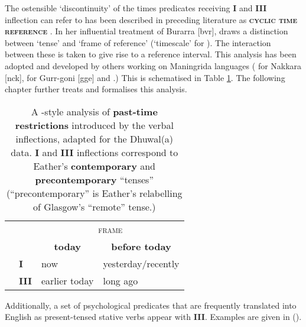  The ostensible `discontinuity' of the times predicates receiving \textbf{I} and \textbf{III} inflection can refer to has been described in preceding literature as \textbf{\textsc{cyclic time reference}} \citep[88]{Comrie1983}. In her influential treatment of Burarra [\gls{bvr}], \citet{Glasgow1964} draws a distinction between `tense' and `frame of reference' (`timescale' for \citealt[48]{Green1987}). The interaction between these is taken to give rise to a reference interval. This analysis has been adopted and developed by others working on Maningrida languages (\citet[165]{Eather2011} for Nakkara [\gls{nck}], \citet{Green1995} for Gurr-goni [\gls{gge}] and \citet{McKay2000}.) This is schematised in Table \ref{GlaswegianTR}. The following chapter further treats and formalises this analysis.


\begin{table}[h]\centering\onehalfspacing
	\begin{tabular}{@{}llll@{}}\toprule

		&                 & \multicolumn{2}{c}{\textsc{frame}}          \\ 
		&                 & \multicolumn{1}{c}{\textbf{today}}         & \multicolumn{1}{c}{\textbf{before today}}      \\\midrule
		\multirow{2}{*}{\textsc{\rotatebox[origin=c]{90}{infl}}} & \textbf{\phantom{I}I}    & now           & yesterday/recently \\
		& \textbf{III} & earlier today & long ago           \\ \bottomrule%
	\end{tabular}
\caption{A \citet{Glasgow1964}-style analysis of \textbf{past-time restrictions} introduced by the verbal inflections, adapted for the Dhuwal(a) data. \textbf{I} and \textbf{III} inflections correspond to Eather's \textbf{contemporary} and \textbf{precontemporary} ``tenses'' (``precontemporary'' is Eather's \citeyearpar[166]{Eather2011} relabelling of Glasgow's ``remote'' tense.)}\label{GlaswegianTR}
\end{table}


Additionally, a set of psychological predicates that are frequently translated into English as present-tensed stative verbs appear with \textbf{III}. Examples are given in (\nextx).


